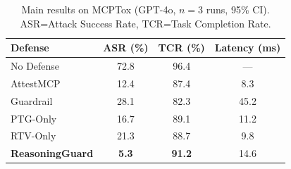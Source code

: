 \begin{table}[t]
\centering\small
\begin{tabular}{lccc}
\toprule
\textbf{Defense} & \textbf{ASR (\%)} & \textbf{TCR (\%)} & \textbf{Latency (ms)} \\
\midrule
{No Defense} & {72.8} & {96.4} & --- \\
{AttestMCP} & {12.4} & {87.4} & 8.3 \\
{Guardrail} & {28.1} & {82.3} & 45.2 \\
{PTG-Only} & {16.7} & {89.1} & 11.2 \\
{RTV-Only} & {21.3} & {88.7} & 9.8 \\
\textbf{ReasoningGuard} & \textbf{5.3} & \textbf{91.2} & 14.6 \\
\bottomrule
\end{tabular}
\caption{Main results on MCPTox (GPT-4o, $n{=}3$ runs, 95\% CI). ASR=Attack Success Rate, TCR=Task Completion Rate.}
\label{tab:main}
\end{table}